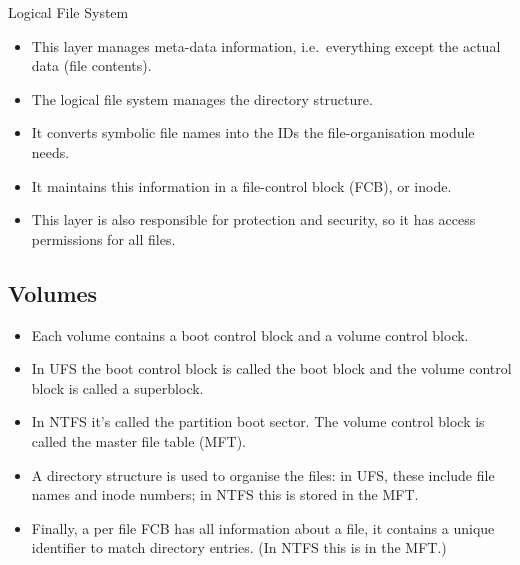 \documentclass{beamer}
\begin{document}
\begin{frame}{\insertsubsectionhead}{Logical File System}
  \begin{itemize}
    \item This layer manages meta-data information, i.e.\ everything except the 
      actual data (file contents).

    \item The logical file system manages the directory structure.

    \item It converts symbolic file names into the IDs the file-organisation 
      module needs.

    \item It maintains this information in a file-control block (FCB), or 
      inode.

    \item This layer is also responsible for protection and security, so it has 
      access permissions for all files.

  \end{itemize}
\end{frame}

\subsection{Volumes}

\begin{frame}{\insertsubsectionhead}
  \begin{itemize}
    \item Each volume contains a boot control block and a volume control block.

    \item In UFS the boot control block is called the boot block and the volume 
      control block is called a superblock.

    \item In NTFS it's called the partition boot sector.
      The volume control block is called the master file table (MFT).

    \item A directory structure is used to organise the files: in UFS, these 
      include file names and inode numbers;
      in NTFS this is stored in the MFT.

    \item Finally, a per file FCB has all information about a file, it contains 
      a unique identifier to match directory entries.
      (In NTFS this is in the MFT.)

  \end{itemize}
\end{frame}
\end{document}
